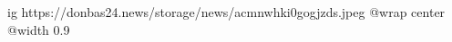  
 
 
 
 

\ifcmt
  ig https://donbas24.news/storage/news/acmnwhki0gogjzds.jpeg
  @wrap center
  @width 0.9
\fi
